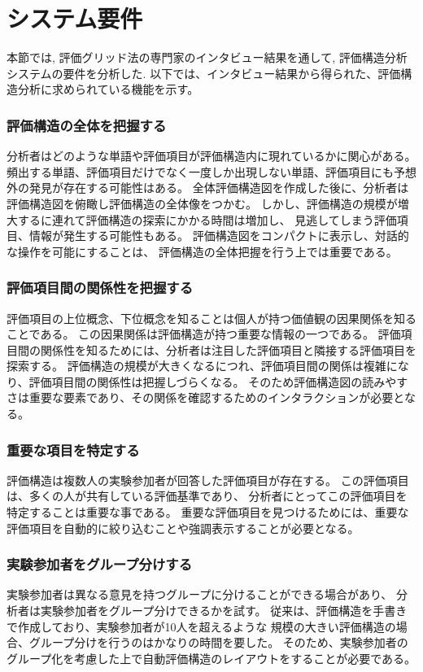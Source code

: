 \documentclass[syuuron]{kuee}
\begin{document}
	\section{システム要件}
		本節では, 評価グリッド法の専門家のインタビュー結果\cite{hak1}を通して, 評価構造分析システムの要件を分析した. 
		以下では、インタビュー結果から得られた、評価構造分析に求められている機能を示す。
		\subsubsection{評価構造の全体を把握する}
			分析者はどのような単語や評価項目が評価構造内に現れているかに関心がある。
			頻出する単語、評価項目だけでなく一度しか出現しない単語、評価項目にも予想外の発見が存在する可能性はある。
			全体評価構造図を作成した後に、分析者は評価構造図を俯瞰し評価構造の全体像をつかむ。
			しかし、評価構造の規模が増大するに連れて評価構造の探索にかかる時間は増加し、
			見逃してしまう評価項目、情報が発生する可能性もある。
			評価構造図をコンパクトに表示し、対話的な操作を可能にすることは、
			評価構造の全体把握を行う上では重要である。
		\subsubsection{評価項目間の関係性を把握する}
			評価項目の上位概念、下位概念を知ることは個人が持つ価値観の因果関係を知ることである。
			この因果関係は評価構造が持つ重要な情報の一つである。
			評価項目間の関係性を知るためには、分析者は注目した評価項目と隣接する評価項目を探索する。
			評価構造の規模が大きくなるにつれ、評価項目間の関係は複雑になり、評価項目間の関係性は把握しづらくなる。
			そのため評価構造図の読みやすさは重要な要素であり、その関係を確認するためのインタラクションが必要となる。
		\subsubsection{重要な項目を特定する}
			評価構造は複数人の実験参加者が回答した評価項目が存在する。
			この評価項目は、多くの人が共有している評価基準であり、
			分析者にとってこの評価項目を特定することは重要な事である。
			重要な評価項目を見つけるためには、重要な評価項目を自動的に絞り込むことや強調表示することが必要となる。
		\subsubsection{実験参加者をグループ分けする}%
			実験参加者は異なる意見を持つグループに分けることができる場合があり、
			分析者は実験参加者をグループ分けできるかを試す。
			従来は、評価構造を手書きで作成しており、実験参加者が10人を超えるような
			規模の大きい評価構造の場合、グループ分けを行うのはかなりの時間を要した。
			そのため、実験参加者のグループ化を考慮した上で自動評価構造のレイアウトをすることが必要である。
\end{document}
